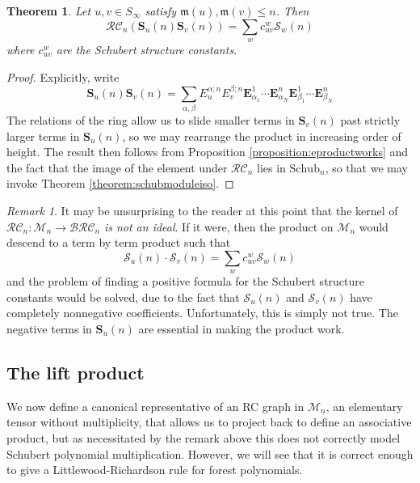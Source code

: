 \documentclass{amsart}
\newtheorem{theorem}{Theorem}[section]
\theoremstyle{definition}
\theoremstyle{remark}
\newtheorem*{remark}{Remark}
\numberwithin{equation}{subsection}
\newcommand{\BRC}{\mathcal{BRC}}
\newcommand{\RC}{\mathcal{RC}}
\newcommand{\maxd}{\mathfrak{m}}
\begin{document}
\begin{theorem} \label{theorem:schubproduct}
Let $u,v\in S_\infty$ satisfy $\maxd(u),\maxd(v)\leq n$. Then
$$\RC_n(\mathbf{S}_u(n)\mathbf{S}_v(n)) = \sum_{w} c_{uv}^w \mathcal{S}_w(n)$$
where $c_{uv}^w$ are the Schubert structure constants.
\end{theorem}
\begin{proof}
  Explicitly, write
  $$\mathbf{S}_u(n)\mathbf{S}_v(n) = \sum_{\alpha,\beta} E_u^{\alpha;n}E_v^{\beta;n} \mathbf{E}_{\alpha_1}^1 \cdots  \mathbf{E}_{\alpha_N}^n \mathbf{E}_{\beta_1}^1 \cdots  \mathbf{E}_{\beta_N}^n$$
  The relations of the ring allow us to slide smaller terms in $\mathbf{S}_v(n)$ past strictly larger terms in $\mathbf{S}_u(n)$, so we may rearrange the product in increasing order of height. The result then follows from Proposition \ref{proposition:eproductworks} and the fact that the image of the element under $\RC_n$ lies in $\mathrm{Schub}_n$, so that we may invoke Theorem \ref{theorem:schubmoduleiso}.
\end{proof}

\begin{remark}
It may be unsurprising to the reader at this point that the kernel of $\RC_n:\mathcal{M}_n\to \BRC_n$ \emph{is not an ideal}. If it were, then the product on $\mathcal{M}_n$ would descend to a term by term product such that
$$\mathcal{S}_u(n)\cdot \mathcal{S}_v(n) = \sum_{w} c_{uv}^w \mathcal{S}_w(n)$$
and the problem of finding a positive formula for the Schubert structure constants would be solved, due to the fact that $\mathcal{S}_u(n)$ and $\mathcal{S}_v(n)$ have completely nonnegative coefficients. Unfortunately, this is simply not true. The negative terms in $\mathbf{S}_u(n)$ are essential in making the product work.
\end{remark}


\subsection{The lift product}\label{section:liftproduct}

We now define a canonical representative of an RC graph in $\mathcal{M}_n$, an elementary tensor without multiplicity, that allows us to project back to define an associative product, but as necessitated by the remark above this does not correctly model Schubert polynomial multiplication. However, we will see that it is correct enough to give a Littlewood-Richardson rule for forest polynomials.
\end{document}

